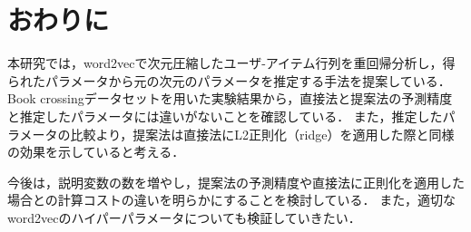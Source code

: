 \section{おわりに}
本研究では，word2vecで次元圧縮したユーザ-アイテム行列を重回帰分析し，得られたパラメータから元の次元のパラメータを推定する手法を提案している．
Book crossingデータセットを用いた実験結果から，直接法と提案法の予測精度と推定したパラメータには違いがないことを確認している．
また，推定したパラメータの比較より，提案法は直接法にL2正則化（ridge）を適用した際と同様の効果を示していると考える．

今後は，説明変数の数を増やし，提案法の予測精度や直接法に正則化を適用した場合との計算コストの違いを明らかにすることを検討している．
また，適切なword2vecのハイパーパラメータについても検証していきたい．